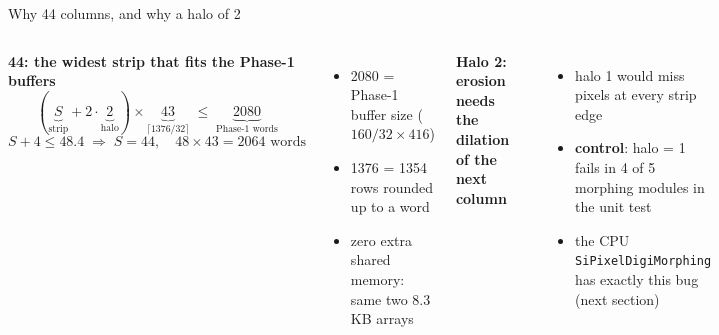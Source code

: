 \documentclass[aspectratio=169,10pt,xcolor=table]{beamer}
\newcommand{\pos}[1]{\textcolor{cbBlue}{#1}}
\newcommand{\code}[1]{\texttt{\small #1}}
\begin{document}
\begin{frame}{Why 44 columns, and why a halo of 2}
  \begin{columns}[T]
    \textbf{44: the widest strip that fits the Phase-1 buffers}
    \[
      (\underbrace{S}_{\text{strip}} + 2\cdot\underbrace{2}_{\text{halo}})\times\underbrace{43}_{\lceil 1376/32\rceil} \;\le\; \underbrace{2080}_{\text{Phase-1 words}}
    \]
    \[
      S + 4 \le 48.4 \;\Rightarrow\; S = 44, \quad 48\times43 = 2064 \text{ words}
    \]
    \begin{itemize}\small
      \item 2080 = Phase-1 buffer size ($160/32 \times 416$)
      \item 1376 = 1354 rows rounded up to a word
      \item \pos{zero extra shared memory}: same two 8.3\,KB arrays
    \end{itemize}
    \textbf{Halo 2: erosion needs the dilation of the next column}
    \vspace{2pt}
    \begin{center}
    \end{center}
    \begin{itemize}\small
      \item halo 1 would miss pixels at every strip edge
      \item \textbf{control}: halo = 1 fails in 4 of 5 morphing modules in the unit test
      \item the CPU \code{SiPixelDigiMorphing} has exactly this bug (next section)
    \end{itemize}
  \end{columns}
\end{frame}
\end{document}
